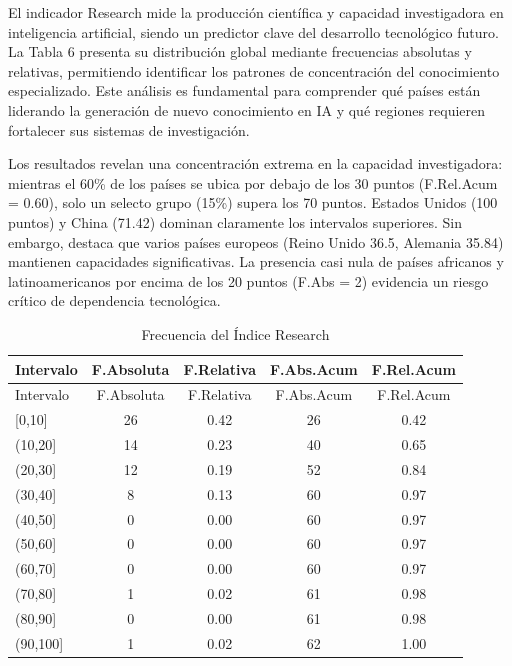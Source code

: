 \documentclass[
]{article}
\begin{document}
\begin{multicols}{2}
El indicador Research mide la producción científica y capacidad investigadora en inteligencia artificial, siendo un predictor clave del desarrollo tecnológico futuro. La Tabla 6 presenta su distribución global mediante frecuencias absolutas y relativas, permitiendo identificar los patrones de concentración del conocimiento especializado. Este análisis es fundamental para comprender qué países están liderando la generación de nuevo conocimiento en IA y qué regiones requieren fortalecer sus sistemas de investigación.

Los resultados revelan una concentración extrema en la capacidad investigadora: mientras el 60\% de los países se ubica por debajo de los 30 puntos (F.Rel.Acum = 0.60), solo un selecto grupo (15\%) supera los 70 puntos. Estados Unidos (100 puntos) y China (71.42) dominan claramente los intervalos superiores. Sin embargo, destaca que varios países europeos (Reino Unido 36.5, Alemania 35.84) mantienen capacidades significativas. La presencia casi nula de países africanos y latinoamericanos por encima de los 20 puntos (F.Abs = 2) evidencia un riesgo crítico de dependencia tecnológica.

\end{multicols}

\begin{longtable}[]{@{}lcccc@{}}
\caption{Frecuencia del Índice Research}\tabularnewline
\toprule\noalign{}
Intervalo & F.Absoluta & F.Relativa & F.Abs.Acum & F.Rel.Acum \\
\midrule\noalign{}
\endfirsthead
\toprule\noalign{}
Intervalo & F.Absoluta & F.Relativa & F.Abs.Acum & F.Rel.Acum \\
\midrule\noalign{}
\endhead
\bottomrule\noalign{}
\endlastfoot
{[}0,10{]} & 26 & 0.42 & 26 & 0.42 \\
(10,20{]} & 14 & 0.23 & 40 & 0.65 \\
(20,30{]} & 12 & 0.19 & 52 & 0.84 \\
(30,40{]} & 8 & 0.13 & 60 & 0.97 \\
(40,50{]} & 0 & 0.00 & 60 & 0.97 \\
(50,60{]} & 0 & 0.00 & 60 & 0.97 \\
(60,70{]} & 0 & 0.00 & 60 & 0.97 \\
(70,80{]} & 1 & 0.02 & 61 & 0.98 \\
(80,90{]} & 0 & 0.00 & 61 & 0.98 \\
(90,100{]} & 1 & 0.02 & 62 & 1.00 \\
\end{longtable}
\end{document}
